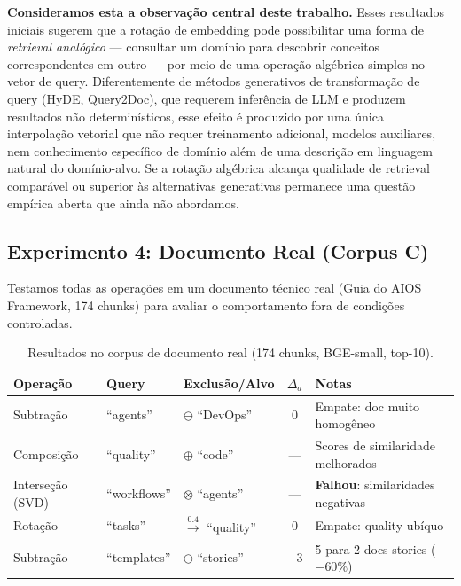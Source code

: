 \documentclass{article}
\begin{document}
\textbf{Consideramos esta a observação central deste trabalho.} Esses resultados iniciais sugerem que a rotação de embedding pode possibilitar uma forma de \emph{retrieval analógico} --- consultar um domínio para descobrir conceitos correspondentes em outro --- por meio de uma operação algébrica simples no vetor de query. Diferentemente de métodos generativos de transformação de query (HyDE, Query2Doc), que requerem inferência de LLM e produzem resultados não determinísticos, esse efeito é produzido por uma única interpolação vetorial que não requer treinamento adicional, modelos auxiliares, nem conhecimento específico de domínio além de uma descrição em linguagem natural do domínio-alvo. Se a rotação algébrica alcança qualidade de retrieval comparável ou superior às alternativas generativas permanece uma questão empírica aberta que ainda não abordamos.

\subsection{Experimento 4: Documento Real (Corpus C)}

Testamos todas as operações em um documento técnico real (Guia do AIOS Framework, 174 chunks) para avaliar o comportamento fora de condições controladas.

\begin{table}[ht]
\centering
\caption{Resultados no corpus de documento real (174 chunks, BGE-small, top-10).}
\label{tab:exp4}
\begin{tabular}{lllcl}
\toprule
Operação & Query & Exclusão/Alvo & $\Delta_a$ & Notas \\
\midrule
Subtração & ``agents'' & $\ominus$ ``DevOps'' & 0 & Empate: doc muito homogêneo \\
Composição & ``quality'' & $\oplus$ ``code'' & --- & Scores de similaridade melhorados \\
Interseção (SVD) & ``workflows'' & $\otimes$ ``agents'' & --- & \textbf{Falhou}: similaridades negativas \\
Rotação & ``tasks'' & $\xrightarrow{0.4}$ ``quality'' & 0 & Empate: quality ubíquo \\
Subtração & ``templates'' & $\ominus$ ``stories'' & \textbf{$-3$} & 5 para 2 docs stories ($-60\%$) \\
\bottomrule
\end{tabular}
\end{table}
\end{document}
